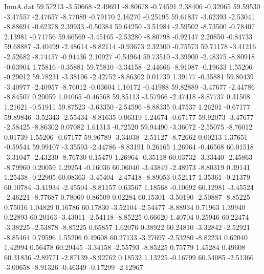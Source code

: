 \begin{filecontents}{ImuA.dat}
  59.57213   -3.50668   -2.49691   -8.80678   -0.74591    2.38406   -0.32065
  59.59530   -3.47557   -2.47657   -8.77089   -0.79170    2.16270   -0.25195
  59.61837   -3.62393   -2.53041   -8.88694   -0.62378    2.39933   -0.50384
  59.64250   -3.51984   -2.59502   -8.73500   -0.78407    2.13981   -0.71756
  59.66569   -3.45165   -2.53280   -8.80798   -0.92147    2.20850   -0.84733
  59.68887   -3.40499   -2.48614   -8.82114   -0.93673    2.32300   -0.75573
  59.71178   -3.41216   -2.52682   -8.74457   -0.94436    2.10927   -0.54964
  59.73510   -3.39900   -2.48375   -8.80918   -0.63904    1.75816   -0.35881
  59.75810   -3.34158   -2.44666   -8.91087   -0.19633    1.55206   -0.29012
  59.78231   -3.38106   -2.42752   -8.86302    0.01739    1.39177   -0.35881
  59.80439   -3.40977   -2.40957   -8.76012   -0.03604    1.10172   -0.41988
  59.82889   -3.47677   -2.44786   -8.84507    0.20059    1.04065   -0.46568
  59.85113   -3.57966   -2.47418   -8.87737    0.31508    1.21621   -0.51911
  59.87523   -3.63350   -2.54596   -8.88335    0.47537    1.26201   -0.67177
  59.89846   -3.52343   -2.55434   -8.81635    0.06319    1.24674   -0.67177
  59.92073   -3.47677   -2.58425   -8.86302    0.07082    1.61313   -0.72520
  59.94490   -3.36072   -2.55075   -8.76012    0.01739    1.55206   -0.67177
  59.96789   -3.34038   -2.51127   -8.72662    0.00213    1.37651   -0.59544
  59.99107   -3.35593   -2.44786   -8.83191    0.26165    1.26964   -0.46568
  60.01518   -3.31047   -2.43230   -8.76730    0.15479    1.26964   -0.35118
  60.03732   -3.33440   -2.45863   -8.79960    0.20059    1.29254   -0.16036
  60.06040   -3.43849   -2.48973   -8.80319    0.39141    1.25438   -0.22905
  60.08363   -3.45404   -2.47418   -8.89053    0.52117    1.35361   -0.21379
  60.10784   -3.41934   -2.45504   -8.81157    0.63567    1.18568   -0.10692
  60.12981   -3.45524   -2.46221   -8.77687    0.78069    0.86509    0.02284
  60.15301   -3.50190   -2.50887   -8.85225    0.75016    1.04829    0.16786
  60.17830   -3.52104   -2.54477   -8.88934    0.71963    1.39940    0.22893
  60.20163   -3.43011   -2.54118   -8.85225    0.66620    1.40704    0.25946
  60.22474   -3.38225   -2.53878   -8.85225    0.65857    1.62076    0.38922
  60.24810   -3.32842   -2.52921   -8.85464    0.79596    1.55206    0.49608
  60.27133   -3.27697   -2.53280   -8.82234    0.62040    1.42994    0.56478
  60.29445   -3.34158   -2.55793   -8.85225    0.75779    1.45284    0.49608
  60.31836   -2.89771   -2.87139   -8.92762    0.18532    1.13225   -0.16799
  60.34085   -2.51366   -3.00658   -8.91326   -0.46349   -0.17299   -2.12967

\end{filecontents}
